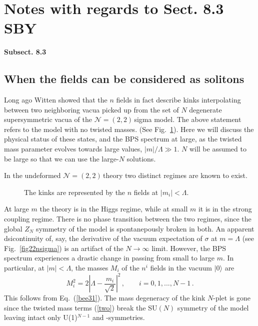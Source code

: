 \documentclass[epsfig,12pt]{article}
\def\beq{\begin{equation}}
\def\eeq{\end{equation}}
\newcommand{\ntt}{${\mathcal N}=(2,2)\,$}
\begin{document}


\section{Notes with regards to Sect. 8.3 SBY}

{\bf Subsect. 8.3}

\subsection{When the  fields can be considered as solitons}
\label{wtnfcb}

Long ago Witten showed \cite{W79} that the $n$ fields in fact describe
kinks interpolating between two neighboring vacua picked up from the set of $N$ degenerate 
supersymmetric vacua
of the \ntt sigma model. The above statement refers to the model with no twisted masses.
(See Fig.~\ref{nkin}).
Here we will discuss the physical status of these states, and the BPS spectrum at large,
as the twisted mass parameter evolves towards large values, $|m|/\Lambda \gg1$.
$N$ will be assumed to be large so that we can use the large-$N$ solutions.

In the undeformed \ntt theory two distinct regimes are known to exist.
\begin{figure}
\epsfxsize=5cm
\centerline{\resizebox{5cm}{!}{}}
\caption{\small The kinks are represented by the $n$ fields at $|m_i|<\Lambda$. }
\label{nkin}
\end{figure}
At large $m$
the theory is in the Higgs regime, while at small $m$ it is in the
strong coupling regime.
There is no phase transition between the two regimes, since 
the global $Z_N$ symmetry of the model is spontanepously broken in both.
An apparent dsicontinuity of, say, the derivative of the vacuum expectation of $\sigma$ at
$m=\Lambda$ (see Fig.~\ref{fig22nsigma}) is an artifact of the $N\to\infty$ limit.
However, the BPS spectrum experiences a drastic change in passing from small to large $m$.
In particular, 
at $|m|<\Lambda$, the masses $M_i$ of the $n^i$ fields in the vacuum $|0\rangle$
are
\beq
M_i^2 = 2\left| \Lambda - \frac{m_i}{\sqrt 2}\right|^2\,,\qquad i=0,1, ..., N-1\,.
\label{nkma}
\eeq
This follows from Eq.~(\ref{bee31}). The mass degeneracy of the kink $N$-plet is gone
since the twisted mass terms (\ref{two}) break the SU$(N)$ symmetry of the model leaving intact only
U(1)$^{N-1}$ and \zn-symmetries.
\end{document}
